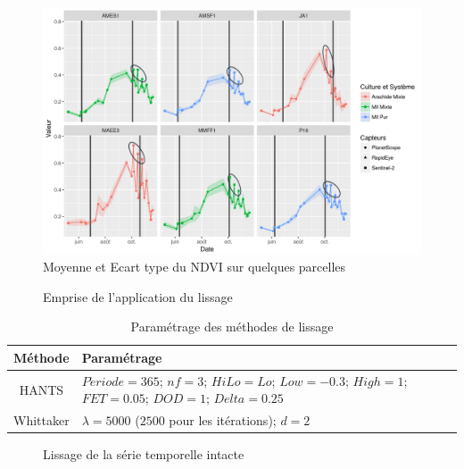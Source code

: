 \begin{figure}[htbp]
 \begin{center}
  \includegraphics[scale=0.7]{materiels_methodes/multisource.png} 
 \end{center}
 \caption{Moyenne et Ecart type du NDVI sur quelques parcelles}
 \label{fig-multisource}
\end{figure}

\begin{figure}[htbp]
 \begin{center}
 \end{center}
 \caption{Emprise de l'application du lissage}
 \label{fig-carte-lissage}
\end{figure}

\begin{table}[htbp]
\begin{center}
\caption{Paramétrage des méthodes de lissage}
\label{tab-param-hants-whit}
 \begin{tabular}{c>{\centering\arraybackslash}p{10cm}}
  \hline
  Méthode & Paramétrage\\
  \hline
  HANTS & $P\acute{e}riode = 365$; $nf = 3$; $HiLo = Lo$; $Low=-0.3$; $High=1$; $FET=0.05$; $DOD=1$; $Delta=0.25$ \\
  Whittaker & $\lambda = 5000$ ($2500$ pour les itérations); $d = 2$ \\
  \hline
 \end{tabular}
\end{center}
\end{table}

\begin{figure}[htbp]
 \begin{center}
 \end{center}
 \caption{Lissage de la série temporelle intacte}
 \label{fig-lissage-prs}
\end{figure}

